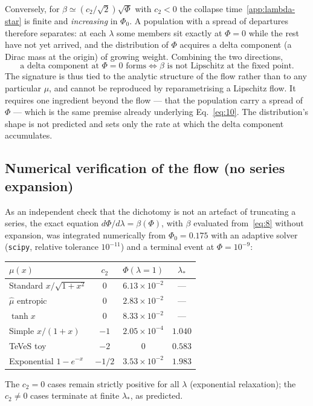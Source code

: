 \documentclass[11pt]{article}
\theoremstyle{plain}
\begin{document}
\smallskip
Conversely, for $\beta\simeq(c_{2}/\sqrt2)\sqrt{\Phi}$ with $c_{2}<0$ the
collapse time~\eqref{app:lambda-star} is finite and \emph{increasing} in
$\Phi_{0}$. A population with a spread of departures therefore separates: at
each $\lambda$ some members sit exactly at $\Phi=0$ while the rest have not yet
arrived, and the distribution of $\Phi$ acquires a delta component (a Dirac mass
at the origin) of
growing weight. Combining the two directions,
\begin{equation}
\text{a delta component at } \Phi=0 \text{ forms}
\iff
\beta \text{ is not Lipschitz at the fixed point.}
\label{app:iff}
\end{equation}
The signature is thus tied to the analytic structure of the flow rather than to
any particular $\mu$, and cannot be reproduced by reparametrising a Lipschitz
flow. It requires one ingredient beyond the flow --- that the population carry a
spread of $\Phi$ --- which is the same premise already underlying
Eq.~\eqref{eq:10}. The distribution's shape is not predicted and sets only the
rate at which the delta component accumulates.

\subsection{Numerical verification of the flow (no series expansion)}
\label{app:numerics}

As an independent check that the dichotomy is not an artefact of truncating a
series, the exact equation $d\Phi/d\lambda=\beta(\Phi)$, with $\beta$
evaluated from~\eqref{eq:8} without expansion, was integrated numerically from
$\Phi_{0}=0.175$ with an adaptive solver (\texttt{scipy}, relative tolerance
$10^{-11}$) and a terminal event at $\Phi=10^{-9}$:
\begin{center}
\begin{tabular}{lccc}
\toprule
$\mu(x)$ & $c_{2}$ & $\Phi(\lambda=1)$ & $\lambda_{*}$ \\
\midrule
Standard $x/\sqrt{1+x^{2}}$ & $0$ & $6.13\times10^{-2}$ & --- \\
$\hat\mu$ entropic          & $0$ & $2.83\times10^{-2}$ & --- \\
$\tanh x$                   & $0$ & $8.33\times10^{-2}$ & --- \\
Simple $x/(1+x)$            & $-1$ & $2.05\times10^{-4}$ & $1.040$ \\
TeVeS toy                   & $-2$ & $0$ & $0.583$ \\
Exponential $1-e^{-x}$      & $-1/2$ & $3.53\times10^{-2}$ & $1.983$ \\
\bottomrule
\end{tabular}
\end{center}
The $c_{2}=0$ cases remain strictly positive for all $\lambda$ (exponential
relaxation); the $c_{2}\neq0$ cases terminate at finite $\lambda_{*}$, as
predicted.
\end{document}
